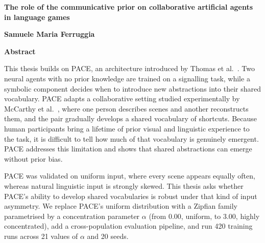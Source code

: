 
\begin{center}
    \textbf{The role of the communicative prior on collaborative artificial agents in language games}
    
    \vspace{0.4cm}
    
    \vspace{0.4cm}
    \textbf{Samuele Maria Ferruggia}
    
    \vspace{0.9cm}
    \textbf{Abstract}
    
\end{center}

This thesis builds on PACE, an architecture introduced by Thomas et al.~\cite{thomas_pace_2025}. Two neural agents with no prior knowledge are trained on a signalling task, while a symbolic component decides when to introduce new abstractions into their shared vocabulary. PACE adapts a collaborative setting studied experimentally by McCarthy et al.~\cite{mccarthy_learning_2021}, where one person describes scenes and another reconstructs them, and the pair gradually develops a shared vocabulary of shortcuts. Because human participants bring a lifetime of prior visual and linguistic experience to the task, it is difficult to tell how much of that vocabulary is genuinely emergent. PACE addresses this limitation and shows that shared abstractions can emerge without prior bias.

PACE was validated on uniform input, where every scene appears equally often, whereas natural linguistic input is strongly skewed. This thesis asks whether PACE's ability to develop shared vocabularies is robust under that kind of input asymmetry. We replace PACE's uniform distribution with a Zipfian family parametrised by a concentration parameter $\alpha$ (from 0.00, uniform, to 3.00, highly concentrated), add a cross-population evaluation pipeline, and run 420 training runs across 21 values of $\alpha$ and 20 seeds.

